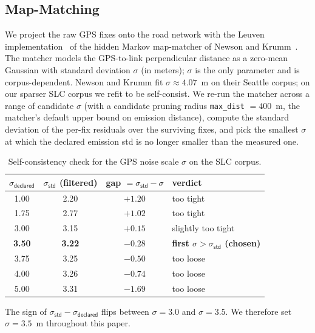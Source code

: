 \documentclass[sigconf, review]{acmart}
\begin{document}
\subsection{Map-Matching}
\label{sec:mapmatching}

We project the raw GPS fixes onto the road network with the
Leuven implementation~\cite{meert2018hmm,leuvenmapmatching} of
the hidden Markov map-matcher of Newson and
Krumm~\cite{newson2009hmm}. The matcher models the
GPS-to-link perpendicular distance as a zero-mean Gaussian with
standard deviation $\sigma$ (in meters); $\sigma$ is the only
parameter and is corpus-dependent. Newson and Krumm
fit $\sigma \approx 4.07$~m on their Seattle corpus; on our
sparser SLC corpus we refit to be self-consist. We re-run the
matcher across a range of candidate $\sigma$ (with a candidate
pruning radius \texttt{max\_dist} $= 400$~m, the matcher's
default upper bound on emission distance), compute the standard
deviation of the per-fix residuals over the surviving fixes,
and pick the smallest $\sigma$ at which the declared emission
std is no longer smaller than the measured one.

\begin{table}[H]
\centering
\caption{Self-consistency check for the GPS noise scale $\sigma$
on the SLC corpus.}
\label{tab:sigma-choice}
\setlength{\tabcolsep}{6pt}
\begin{tabular}{cccl}
\toprule
$\sigma_{\textsf{declared}}$ & $\sigma_{\textsf{std}}$ (filtered)
   & gap $= \sigma_{\textsf{std}} - \sigma$ & verdict \\
\midrule
1.00 & 2.20 & $+1.20$ & too tight \\
1.75 & 2.77 & $+1.02$ & too tight \\
3.00 & 3.15 & $+0.15$ & slightly too tight \\
\textbf{3.50} & \textbf{3.22} & $\mathbf{-0.28}$
   & \textbf{first $\sigma > \sigma_{\textsf{std}}$ (chosen)} \\
3.75 & 3.25 & $-0.50$ & too loose \\
4.00 & 3.26 & $-0.74$ & too loose \\
5.00 & 3.31 & $-1.69$ & too loose \\
\bottomrule
\end{tabular}
\end{table}

\noindent The sign of $\sigma_{\textsf{std}} -
\sigma_{\textsf{declared}}$ flips between $\sigma = 3.0$ and
$\sigma = 3.5$. We therefore set $\sigma = 3.5$~m throughout
this paper.
\end{document}
